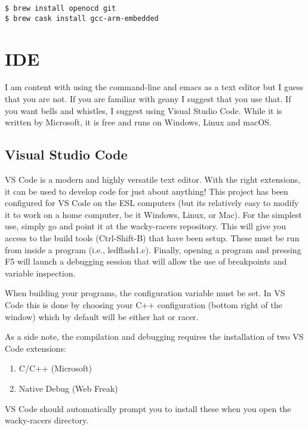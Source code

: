 \begin{verbatim}
$ brew install openocd git
$ brew cask install gcc-arm-embedded
\end{verbatim}


\section{IDE}

I am content with using the command-line and emacs as a text editor
but I guess that you are not.  If you are familiar with geany I
suggest that you use that.  If you want bells and whistles, I suggest
using Visual Studio Code.  While it is written by Microsoft, it is
free and runs on Windows, Linux and macOS.


\subsection{Visual Studio Code}

VS Code is a modern and highly versatile text editor.  With the right
extensions, it can be used to develop code for just about anything!
This project has been configured for VS Code on the ESL computers (but
its relatively easy to modify it to work on a home computer, be it
Windows, Linux, or Mac). For the simplest use, simply go  and point it at the wacky-racers repository.  This will
give you access to the build tools (Ctrl-Shift-B) that have been
setup. These must be run from inside a program (i.e., ledflash1.c).
Finally, opening a program and pressing F5 will launch a debugging
session that will allow the use of breakpoints and variable
inspection.

When building your programs, the  configuration variable
must be set. In VS Code this is done by choosing your C++
configuration (bottom right of the window) which by default will be
either hat or racer.

As a side note, the compilation and debugging requires the
installation of two VS Code extensions:
%
\begin{enumerate}
\item C/C++ (Microsoft)
\item Native Debug (Web Freak)
\end{enumerate}
%
VS Code should automatically prompt you to install these when you open
  the wacky-racers directory.
